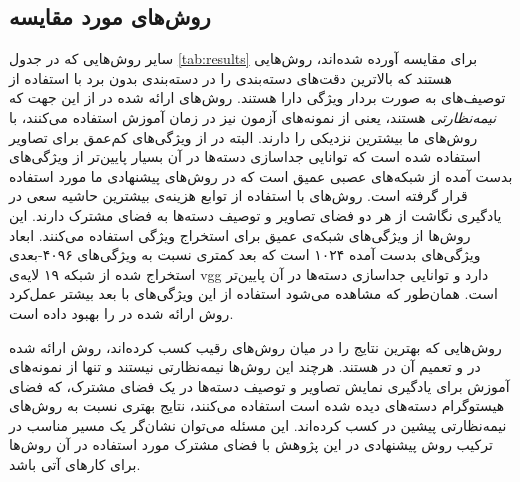 \subsection{روش‌های مورد مقایسه}\label{exp:other_methods}
سایر روش‌هایی که در جدول  \ref{tab:results} برای مقایسه آورده شده‌اند، روش‌هایی هستند که بالاترین دقت‌های دسته‌بندی را در دسته‌بندی بدون برد با استفاده از توصیف‌های به صورت بردار ویژگی دارا هستند.
روش‌های ارائه شده در
\cite{li15max, semi15, Kodirov2015}
از این جهت که \textit{نیمه‌نظارتی} هستند، یعنی از  نمونه‌های آزمون نیز در زمان آموزش استفاده می‌کنند، با روش‌های ما بیشترین نزدیکی را دارند. البته در
\cite{li15max, semi15}
از ویژگی‌های کم‌عمق برای تصاویر استفاده شده است که توانایی جداسازی دسته‌ها در آن بسیار پایین‌تر از ویژگی‌های بدست آمده از شبکه‌های عصبی عمیق است که در روش‌های پیشنهادی ما مورد استفاده قرار گرفته است. روش‌های
\cite{Akata2015, Xian2016}
با استفاده از توابع هزینه‌ی بیشترین حاشیه سعی در یادگیری نگاشت از هر دو فضای تصاویر و توصیف دسته‌ها به فضای مشترک دارند. این روش‌ها از ویژگی‌های شبکه‌ی عمیق
 \cite{googlenet}
 برای استخراج ویژگی استفاده می‌کنند. ابعاد ویژگی‌های بدست آمده ۱۰۲۴ است که بعد کمتری نسبت به ویژگی‌های ۴۰۹۶-بعدی استخراج شده از شبکه ۱۹ لایه‌ی vgg دارد و توانایی جداسازی دسته‌ها در آن پایین‌تر است. همان‌طور که مشاهده می‌شود استفاده از این ویژگی‌های با بعد بیشتر عمل‌کرد روش ارائه شده در \cite{Akata2015} را بهبود داده است.

 روش‌هایی که بهترین نتایج را در میان روش‌های رقیب کسب کرده‌اند، روش ارائه شده در \cite{sse} و تعمیم آن در \cite{agnostic}  هستند. هرچند این روش‌ها نیمه‌نظارتی نیستند و تنها از نمونه‌های آموزش برای یادگیری نمایش تصاویر و توصیف دسته‌ها در یک فضای مشترک، که فضای هیستوگرام دسته‌های دیده شده است استفاده می‌کنند، نتایج بهتری نسبت به روش‌های نیمه‌نظارتی پیشین در \cite{li15max, semi15, Kodirov2015} کسب کرده‌اند. این مسئله می‌توان نشان‌گر یک مسیر مناسب در ترکیب روش پیشنهادی در این پژوهش با فضای مشترک مورد استفاده در آن روش‌ها برای کارهای آتی باشد.

